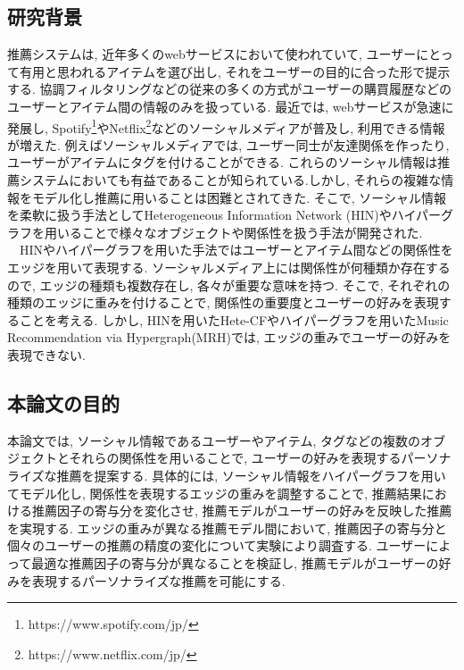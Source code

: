 \documentclass[a4j,11pt]{jarticle}           %
\begin{document}
	\subsection{研究背景}
	推薦システムは, 近年多くのwebサービスにおいて使われていて, ユーザーにとって有用と思われるアイテムを選び出し,  それをユーザーの目的に合った形で提示する\cite{rec1}\cite{rec2}\cite{rec3}. 協調フィルタリング\cite{cf}などの従来の多くの方式がユーザーの購買履歴などのユーザーとアイテム間の情報のみを扱っている. 最近では, webサービスが急速に発展し, Spotify\footnote{https://www.spotify.com/jp/}やNetflix\footnote{https://www.netflix.com/jp/}などのソーシャルメディアが普及し, 
	利用できる情報が増えた. 例えばソーシャルメディアでは, ユーザー同士が友達関係を作ったり, ユーザーがアイテムにタグを付けることができる. これらのソーシャル情報は推薦システムにおいても有益であることが知られている\cite{social}\cite{tag}.しかし, それらの複雑な情報をモデル化し推薦に用いることは困難とされてきた.
	そこで, ソーシャル情報を柔軟に扱う手法としてHeterogeneous Information Network (HIN)\cite{HIN}やハイパーグラフ\cite{hyper}を用いることで様々なオブジェクトや関係性を扱う手法が開発された. 
	\\　HIN\cite{HIN}やハイパーグラフ\cite{hyper}を用いた手法ではユーザーとアイテム間などの関係性をエッジを用いて表現する. ソーシャルメディア上には関係性が何種類か存在するので, 
	エッジの種類も複数存在し, 各々が重要な意味を持つ. そこで, それぞれの種類のエッジに重みを付けることで, 関係性の重要度とユーザーの好みを表現することを考える. 
	しかし, HIN\cite{HIN}を用いたHete-CF\cite{Hete}やハイパーグラフ\cite{hyper}を用いたMusic Recommendation via Hypergraph(MRH)\cite{MRH}では, 
	エッジの重みでユーザーの好みを表現できない. 
	
	\subsection{本論文の目的}
	本論文では, ソーシャル情報であるユーザーやアイテム, タグなどの複数のオブジェクトとそれらの関係性を用いることで, ユーザーの好みを表現するパーソナライズな推薦を提案する. 
	具体的には, ソーシャル情報をハイパーグラフを用いてモデル化し, 関係性を表現するエッジの重みを調整することで, 推薦結果における推薦因子の寄与分を変化させ, 
	推薦モデルがユーザーの好みを反映した推薦を実現する. エッジの重みが異なる推薦モデル間において, 推薦因子の寄与分と個々のユーザーの推薦の精度の変化について実験により調査する. 
	ユーザーによって最適な推薦因子の寄与分が異なることを検証し, 推薦モデルがユーザーの好みを表現するパーソナライズな推薦を可能にする. 
	
\end{document}
